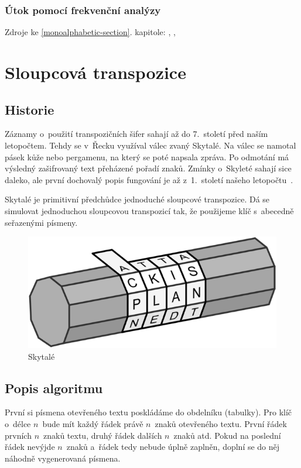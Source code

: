 \documentclass[glossaries, index]{kidiplom}
\begin{document}
\subsubsection{Útok pomocí frekvenční analýzy}


\vspace*{\fill}

\noindent
Zdroje ke \ref{monoalphabetic-section}. kapitole: \cite{substitutionwiki}, \cite{monoalphabeticwiki}, \cite{singh2009}

\newpage


\section{Sloupcová transpozice}
\label{transposition-section}
%

\subsection{Historie}
Záznamy o~použití transpozičních šifer sahají až do 7.~století před naším letopočtem. Tehdy se v~Řecku využíval válec zvaný Skytalé. Na válec se namotal pásek kůže nebo pergamenu, na který se poté napsala zpráva. Po odmotání má výsledný zašifrovaný text přeházené pořadí znaků. Zmínky o~Skyleté sahají sice daleko, ale první dochovalý popis fungování je až z~1.~století našeho letopočtu~\cite{scytalewiki}.

Skytalé je primitivní předchůdce jednoduché sloupcové transpozice. Dá se simulovat jednoduchou sloupcovou transpozicí tak, že použijeme klíč s~abecedně seřazenými písmeny.

\begin{figure}[htbp]
\centering
\includegraphics[scale=0.4]{graphics/skytale.png}
\caption{Skytalé}
\end{figure}

\subsection{Popis algoritmu}
První si písmena otevřeného textu poskládáme do obdelníku (tabulky). Pro klíč o~délce $n$~bude mít každý řádek právě $n$~znaků otevřeného textu. První řádek prvních $n$~znaků textu, druhý řádek dalších $n$~znaků atd. Pokud na poslední řádek nevýjde $n$~znaků a~řádek tedy nebude úplně zaplněn, doplní se do něj náhodně vygenerovaná písmena.
\end{document}
